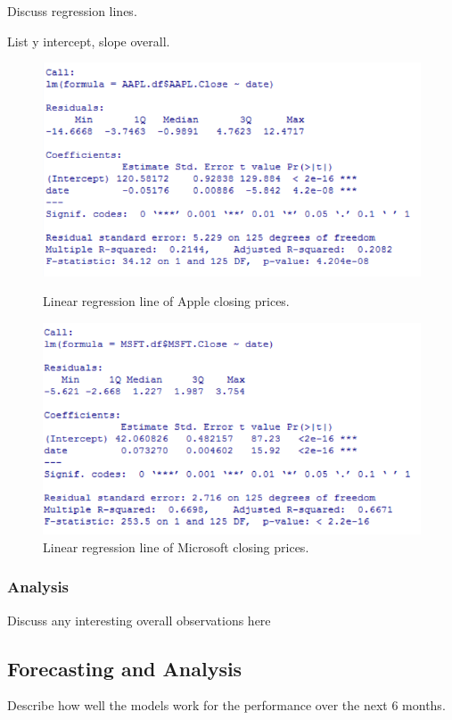 \documentclass[paper=a4, fontsize=11pt]{scrartcl} %
\numberwithin{equation}{section} %
\numberwithin{figure}{section} %
\numberwithin{table}{section} %
\begin{document}
Discuss regression lines. 

List y intercept, slope overall. 

\begin{figure}[!htb]
  \includegraphics[width=\linewidth]{graph/aapl_reg_10.png}
  \caption{Linear regression line of Apple closing prices.}
\endminipage\hfill
{}
  \includegraphics[width=\linewidth]{graph/msft_reg_10.png}
  \caption{Linear regression line of Microsoft closing prices.}
\endminipage\hfill
\end{figure}


\subsubsection{Analysis}
Discuss any interesting overall observations here


\subsection{Forecasting and Analysis}

Describe how well the models work for the performance over the next 6 months. 
\end{document}
